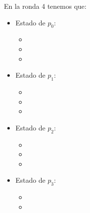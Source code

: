 En la ronda 4 tenemos que:
\begin{multicols}{2}
\begin{itemize}
\item Estado de $p_0$:
      \begin{itemize}
      \item {}
      
      \item {}
      
      \item {}
      \end{itemize}
      
\item Estado de $p_1$:
      \begin{itemize}
      \item {}
      
      \item {}
      
      \item {}
      \end{itemize}

\item Estado de $p_2$:
      \begin{itemize}
      \item {}
      
      \item {}
      
      \item {}
      \end{itemize}

\item Estado de $p_3$:
      \begin{itemize}
      \item {}
      
      \item {}
      

\end{itemize}
\end{itemize}
\end{multicols}
